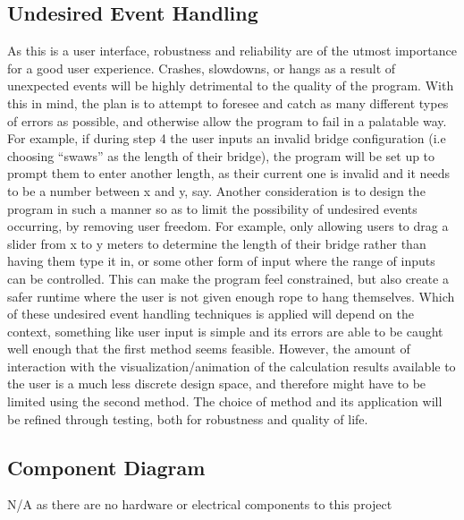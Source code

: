 \documentclass[12pt, titlepage]{article}
\begin{document}
\subsection{Undesired Event Handling}
As this is a user interface, robustness and reliability are of the utmost importance for a good user experience. Crashes, slowdowns, or hangs as a result of unexpected events will be highly detrimental to the quality of the program. With this in mind, the plan is to attempt to foresee and catch as many different types of errors as possible, and otherwise allow the program to fail in a palatable way. For example, if during step 4 the user inputs an invalid bridge configuration (i.e choosing “swaws” as the length of their bridge), the program will be set up to prompt them to enter another length, as their current one is invalid and it needs to be a number between x and y, say.
Another consideration is to design the program in such a manner so as to limit the possibility of undesired events occurring, by removing user freedom. For example, only allowing users to drag a slider from x to y meters to determine the length of their bridge rather than having them type it in, or some other form of input where the range of inputs can be controlled. This can make the program feel constrained, but also create a safer runtime where the user is not given enough rope to hang themselves.
Which of these undesired event handling techniques is applied will depend on the context, something like user input is simple and its errors are able to be caught well enough that the first method seems feasible. However, the amount of interaction with the visualization/animation of the calculation results available to the user is a much less discrete design space, and therefore might have to be limited using the second method. The choice of method and its application will be refined through testing, both for robustness and quality of life.
\subsection{Component Diagram}
N/A as there are no hardware or electrical components to this project

\newpage
\end{document}
